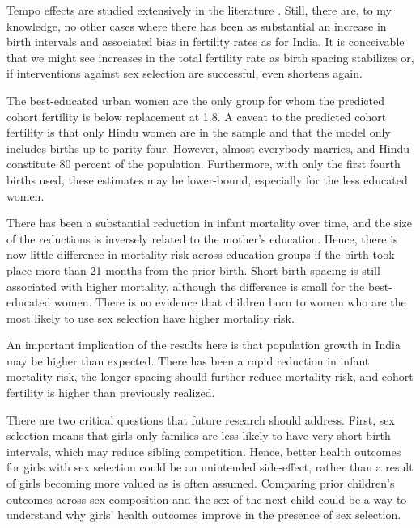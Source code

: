 \documentclass[12pt,letterpaper]{article}
\begin{document}
Tempo effects are studied extensively in the literature \citep[See, for example, ][]{Bongaarts1999}.
Still, there are, to my knowledge, no other cases where there has been as 
substantial an increase in birth intervals and associated bias in fertility rates 
as for India.
It is conceivable that we might see increases in the total fertility rate as birth spacing 
stabilizes or, if interventions against sex selection are successful, even shortens again.

The best-educated urban women are the only group for whom the predicted cohort fertility 
is below replacement at 1.8. 
A caveat to the predicted cohort fertility is that only Hindu women are in the sample and 
that the model only includes births up to parity four.
However, almost everybody marries, and Hindu constitute 80 percent of the population.
Furthermore, with only the first fourth births used, these estimates may
be lower-bound, especially for the less educated women.

There has been a substantial reduction in infant mortality over time, and the size of the 
reductions is inversely related to the mother's education.
Hence, there is now little difference in mortality risk across education groups if the 
birth took place more than 21 months from the prior birth.
Short birth spacing is still associated with higher mortality, although the difference is 
small for the best-educated women.
There is no evidence that children born to women who are the most likely to use sex 
selection have higher mortality risk. 

An important implication of the results here is that population growth in India
may be higher than expected. 
There has been a rapid reduction in infant mortality risk, the longer spacing should 
further reduce mortality risk, and cohort fertility is higher than previously realized.



There are two critical questions that future research should address.
First, sex selection means that girls-only families are less likely to have
very short birth intervals, which may reduce sibling competition. 
Hence, better health outcomes for girls with sex selection could be an
unintended side-effect, rather than a result of girls becoming more
valued as is often assumed. 
Comparing prior children's outcomes across sex composition and the sex of the next child 
could be a way to understand why girls' health outcomes improve in the presence of sex selection.
\end{document}
